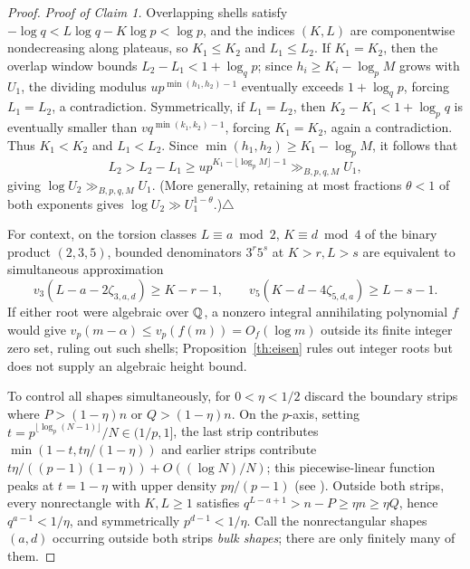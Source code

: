 \documentclass[11pt]{article}
\begin{document}
\begin{proof}
\smallskip\noindent\emph{Proof of Claim 1.} Overlapping shells satisfy $-\log q<L\log q-K\log p<\log p$, and the indices $(K,L)$ are componentwise nondecreasing along plateaus, so $K_1\le K_2$ and $L_1\le L_2$. If $K_1=K_2$, then the overlap window bounds $L_2-L_1<1+\log_q p$; since $h_i\ge K_i-\log_p M$ grows with $U_1$, the dividing modulus $up^{\min(h_1,h_2)-1}$ eventually exceeds $1+\log_q p$, forcing $L_1=L_2$, a contradiction. Symmetrically, if $L_1=L_2$, then $K_2-K_1<1+\log_p q$ is eventually smaller than $vq^{\min(k_1,k_2)-1}$, forcing $K_1=K_2$, again a contradiction. Thus $K_1<K_2$ and $L_1<L_2$. Since $\min(h_1,h_2)\ge K_1-\log_p M$, it follows that
\[
 L_2>L_2-L_1\ge up^{K_1-\lfloor\log_p M\rfloor-1}\gg_{B,p,q,M} U_1,
\]
giving $\log U_2\gg_{B,p,q,M} U_1$. (More generally, retaining at most fractions $\theta<1$ of both exponents gives $\log U_2\gg U_1^{1-\theta}$.)\hfill$\triangle$\smallskip

For context, on the torsion classes $L\equiv a\bmod2$, $K\equiv d\bmod4$ of the binary product $(2,3,5)$, bounded denominators $3^r5^s$ at $K>r,L>s$ are equivalent to simultaneous approximation
\[
 v_3(L-a-2\zeta_{3,a,d})\ge K-r-1,\qquad
 v_5(K-d-4\zeta_{5,d,a})\ge L-s-1 .
\]
If either root were algebraic over $\mathbb Q$, a nonzero integral annihilating polynomial $f$ would give $v_p(m-\alpha)\le v_p(f(m))=O_f(\log m)$ outside its finite integer zero set, ruling out such shells; Proposition~\ref{th:eisen} rules out integer roots but does not supply an algebraic height bound.

To control all shapes simultaneously, for $0<\eta<1/2$ discard the boundary strips where $P>(1-\eta)n$ or $Q>(1-\eta)n$. On the $p$-axis, setting $t=p^{\lfloor\log_p(N-1)\rfloor}/N\in(1/p,1]$, the last strip contributes $\min(1-t,t\eta/(1-\eta))$ and earlier strips contribute $t\eta/((p-1)(1-\eta))+O((\log N)/N)$; this piecewise-linear function peaks at $t=1-\eta$ with upper density $p\eta/(p-1)$ (see ). Outside both strips, every nonrectangle with $K,L\ge1$ satisfies $q^{L-a+1}>n-P\ge\eta n\ge\eta Q$, hence $q^{a-1}<1/\eta$, and symmetrically $p^{d-1}<1/\eta$. Call the nonrectangular shapes $(a,d)$ occurring outside both strips \emph{bulk shapes}; there are only finitely many of them.


\end{proof}
\end{document}
